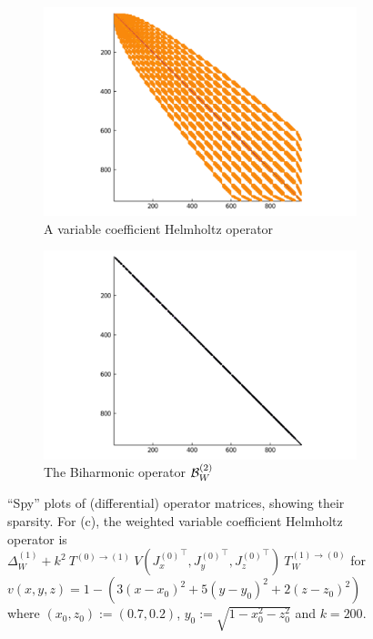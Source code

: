 \documentclass[11pt, oneside]{article}   	%
\begin{document}
\begin{figure}[tp]
	\medskip
	\begin{subfigure}{0.5\textwidth}
		\includegraphics[scale=0.5]{sparsity-of-helmholtz}
		\centering
		\caption{A variable coefficient Helmholtz operator}
	\end{subfigure}\hfil %
	\begin{subfigure}{0.5\textwidth}
		\includegraphics[scale=0.5]{sparsity-of-biharmonic}
		\centering
		\caption{The Biharmonic operator $\mathcal{B}_W^{(2)}$} 
	\end{subfigure}\hfil %
	\caption{\enquote{Spy} plots of (differential) operator matrices, showing their sparsity. For (c), the weighted variable coefficient Helmholtz operator is $\Delta^{(1)}_W + k^2 \: T^{(0)\to(1)} \: V({J_x^{(0)}}^\top, {J_y^{(0)}}^\top, {J_z^{(0)}}^\top) \: T_W^{(1)\to(0)}$ for $v(x,y,z) = 1 - (3(x-x_0)^2 + 5(y-y_0)^2 + 2(z-z_0)^2)$ where $(x_0, z_0) := (0.7, 0.2)$, $y_0 := \sqrt{1 - x_0^2 - z_0^2}$ and $k = 200$.}
	\label{fig:sparsity}
\end{figure}
\end{document}
